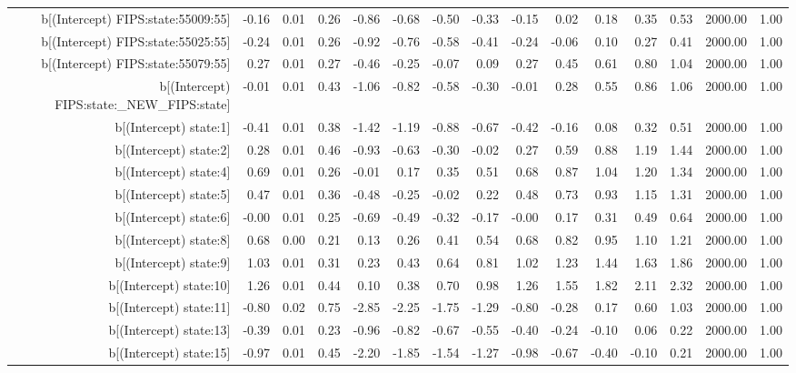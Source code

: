 \begin{table}[ht]
\begin{tabular}{rrrrrrrrrrrrrrr}
  b[(Intercept) FIPS:state:55009:55] & -0.16 & 0.01 & 0.26 & -0.86 & -0.68 & -0.50 & -0.33 & -0.15 & 0.02 & 0.18 & 0.35 & 0.53 & 2000.00 & 1.00 \\ 
  b[(Intercept) FIPS:state:55025:55] & -0.24 & 0.01 & 0.26 & -0.92 & -0.76 & -0.58 & -0.41 & -0.24 & -0.06 & 0.10 & 0.27 & 0.41 & 2000.00 & 1.00 \\ 
  b[(Intercept) FIPS:state:55079:55] & 0.27 & 0.01 & 0.27 & -0.46 & -0.25 & -0.07 & 0.09 & 0.27 & 0.45 & 0.61 & 0.80 & 1.04 & 2000.00 & 1.00 \\ 
  b[(Intercept) FIPS:state:\_NEW\_FIPS:state] & -0.01 & 0.01 & 0.43 & -1.06 & -0.82 & -0.58 & -0.30 & -0.01 & 0.28 & 0.55 & 0.86 & 1.06 & 2000.00 & 1.00 \\ 
  b[(Intercept) state:1] & -0.41 & 0.01 & 0.38 & -1.42 & -1.19 & -0.88 & -0.67 & -0.42 & -0.16 & 0.08 & 0.32 & 0.51 & 2000.00 & 1.00 \\ 
  b[(Intercept) state:2] & 0.28 & 0.01 & 0.46 & -0.93 & -0.63 & -0.30 & -0.02 & 0.27 & 0.59 & 0.88 & 1.19 & 1.44 & 2000.00 & 1.00 \\ 
  b[(Intercept) state:4] & 0.69 & 0.01 & 0.26 & -0.01 & 0.17 & 0.35 & 0.51 & 0.68 & 0.87 & 1.04 & 1.20 & 1.34 & 2000.00 & 1.00 \\ 
  b[(Intercept) state:5] & 0.47 & 0.01 & 0.36 & -0.48 & -0.25 & -0.02 & 0.22 & 0.48 & 0.73 & 0.93 & 1.15 & 1.31 & 2000.00 & 1.00 \\ 
  b[(Intercept) state:6] & -0.00 & 0.01 & 0.25 & -0.69 & -0.49 & -0.32 & -0.17 & -0.00 & 0.17 & 0.31 & 0.49 & 0.64 & 2000.00 & 1.00 \\ 
  b[(Intercept) state:8] & 0.68 & 0.00 & 0.21 & 0.13 & 0.26 & 0.41 & 0.54 & 0.68 & 0.82 & 0.95 & 1.10 & 1.21 & 2000.00 & 1.00 \\ 
  b[(Intercept) state:9] & 1.03 & 0.01 & 0.31 & 0.23 & 0.43 & 0.64 & 0.81 & 1.02 & 1.23 & 1.44 & 1.63 & 1.86 & 2000.00 & 1.00 \\ 
  b[(Intercept) state:10] & 1.26 & 0.01 & 0.44 & 0.10 & 0.38 & 0.70 & 0.98 & 1.26 & 1.55 & 1.82 & 2.11 & 2.32 & 2000.00 & 1.00 \\ 
  b[(Intercept) state:11] & -0.80 & 0.02 & 0.75 & -2.85 & -2.25 & -1.75 & -1.29 & -0.80 & -0.28 & 0.17 & 0.60 & 1.03 & 2000.00 & 1.00 \\ 
  b[(Intercept) state:13] & -0.39 & 0.01 & 0.23 & -0.96 & -0.82 & -0.67 & -0.55 & -0.40 & -0.24 & -0.10 & 0.06 & 0.22 & 2000.00 & 1.00 \\ 
  b[(Intercept) state:15] & -0.97 & 0.01 & 0.45 & -2.20 & -1.85 & -1.54 & -1.27 & -0.98 & -0.67 & -0.40 & -0.10 & 0.21 & 2000.00 & 1.00 \\ 

\end{tabular}
\end{table}
